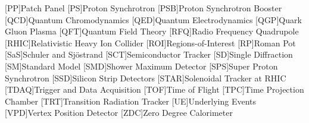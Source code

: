 \begin{acronym}[BRAHMS]
	[PP]{Patch Panel}
	[PS]{Proton Synchrotron}
	[PSB]{Proton Synchrotron Booster}
	[QCD]{Quantum Chromodynamics}
	[QED]{Quantum Electrodynamics}
	[QGP]{Quark Gluon Plasma}
	[QFT]{Quantum Field Theory}
	[RFQ]{Radio Frequency Quadrupole}
	[RHIC]{Relativistic Heavy Ion Collider}
	[ROI]{Regions-of-Interest}
	[RP]{Roman Pot}
	[SaS]{Schuler and Sj{\"o}strand}
	[SCT]{Semiconductor Tracker}
	[SD]{Single Diffraction}
	[SM]{Standard Model}
	[SMD]{Shower Maximum Detector}
	[SPS]{Super Proton Synchrotron}
	[SSD]{Silicon Strip Detectors}
	[STAR]{Solenoidal Tracker at RHIC}
	[TDAQ]{Trigger and Data Acquisition}
	[TOF]{Time of Flight}
	[TPC]{Time Projection Chamber}
	[TRT]{Transition Radiation Tracker}
	[UE]{Underlying Events}
	[VPD]{Vertex Position Detector}
	[ZDC]{Zero Degree Calorimeter}
\end{acronym}
